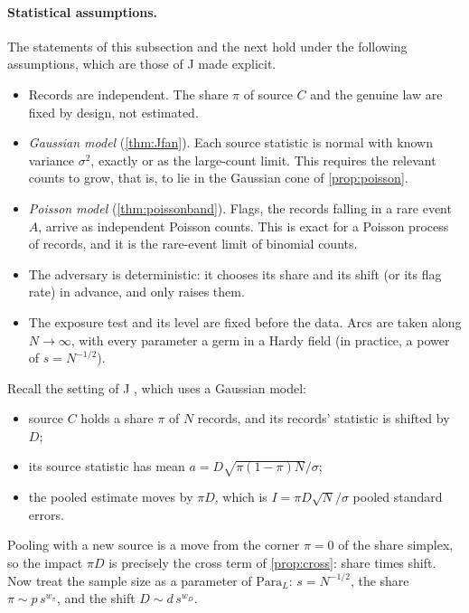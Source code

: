 \documentclass[11pt]{article}
\theoremstyle{definition}\newtheorem{definition}[theorem]{Definition}\newtheorem{remark}[theorem]{Remark}\newtheorem{example}[theorem]{Example}
\begin{document}
\paragraph{Statistical assumptions.} The statements of this subsection and the next hold under the following assumptions, which are
those of J \cite[Theorem J]{Lab} made explicit.
\begin{itemize}
\item[(S1)] Records are independent. The share $\pi$ of source $C$ and the genuine law are fixed by design, not estimated.
\item[(S2)] \emph{Gaussian model} (\cref{thm:Jfan}). Each source statistic is normal with known variance $\sigma^2$, exactly or as the large-count
  limit. This requires the relevant counts to grow, that is, to lie in the Gaussian cone of \cref{prop:poisson}.
\item[(S3)] \emph{Poisson model} (\cref{thm:poissonband}). Flags, the records falling in a rare event $A$, arrive as independent Poisson counts.
  This is exact for a Poisson process of records, and it is the rare-event limit of binomial counts.
\item[(S4)] The adversary is deterministic: it chooses its share and its shift (or its flag rate) in advance, and only raises them.
\item[(S5)] The exposure test and its level are fixed before the data. Arcs are taken along $N\to\infty$, with every parameter a germ in a Hardy field
  (in practice, a power of $s=N^{-1/2}$).
\end{itemize}

Recall the setting of J \cite[Theorem J]{Lab}, which uses a Gaussian model:
\begin{itemize}
\item source $C$ holds a share $\pi$ of $N$ records, and its records' statistic is shifted by $D$;
\item its source statistic has mean $a=D\sqrt{\pi(1-\pi)N}/\sigma$;
\item the pooled estimate moves by $\pi D$, which is $I=\pi D\sqrt N/\sigma$ pooled standard errors.
\end{itemize}
Pooling with a new source is a move from the corner $\pi=0$ of the share simplex, so the impact $\pi D$ is precisely the cross term of
\cref{prop:cross}: share times shift. Now treat the sample size as a parameter of $\mathrm{Para}_L$: $s=N^{-1/2}$, the share $\pi\sim p\,s^{w_\pi}$, and
the shift $D\sim d\,s^{w_D}$.
\end{document}
